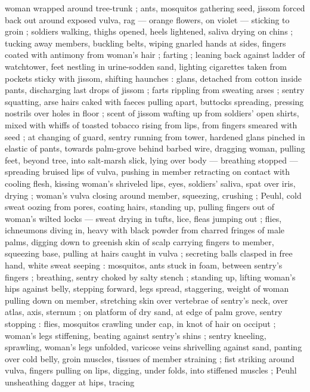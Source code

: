 woman wrapped around tree-trunk ; ants, mosquitos gathering seed, jissom forced back out around
exposed vulva, rag --- orange flowers, on violet --- sticking to groin ; soldiers walking, thighs
opened, heels lightened, saliva drying on chins ; tucking away members, buckling belts, wiping
gnarled hands at sides, fingers coated with antimony from woman's hair ; farting ; leaning back
against ladder of watchtower, feet nestling in urine-sodden sand, lighting cigarettes %
taken from pockets sticky with jissom, shifting haunches : glans, detached from cotton inside pants,
discharging last drops of jissom ; farts rippling from sweating arses ; sentry squatting, arse hairs
caked with faeces pulling apart, buttocks spreading, pressing nostrils over holes in floor ; scent
of jissom wafting up from soldiers' open shirts, mixed with whiffs of toasted tobacco rising from
lips, from fingers smeared with seed ; at changing of guard, sentry running from tower, hardened
glans pinched in elastic of pants, towards palm-grove behind barbed wire, dragging woman, pulling
feet, beyond tree, into salt-marsh slick, lying over body --- breathing stopped --- spreading
bruised lips of vulva, pushing in member retracting on contact with cooling flesh, kissing woman's
shriveled lips, eyes, soldiers' saliva, spat over iris, drying ; woman's vulva closing around
member, squeezing, crushing ; Peuhl, cold sweat oozing from pores, coating hairs, standing up,
pulling fingers out of woman's wilted locks --- sweat drying in tufts, lice, fleas jumping out ;
flies, ichneumons diving in, heavy with black powder from charred fringes of male palms, digging
down to greenish skin of scalp {\dashcom} carrying fingers to member, squeezing base, pulling at
hairs caught in vulva ; secreting balls clasped in free hand, white sweat seeping : mosquitos, ants
stuck in foam, between sentry's fingers ; breathing, sentry choked by salty stench ; standing up,
lifting woman's hips against belly, stepping forward, legs spread, staggering, weight of woman
pulling down on member, stretching skin over vertebrae of sentry's neck, over atlas, axis, sternum ;
on platform of dry sand, at edge of palm grove, sentry stopping : flies, mosquitos crawling under
cap, in knot of hair on occiput ; woman's legs stiffening, beating against sentry's shins ; sentry
kneeling, sprawling, woman's legs unfolded, varicose veins shrivelling against sand, panting over
cold belly, groin muscles, tissues of member straining ; fist striking around vulva, fingers pulling
on lips, digging, under folds, into stiffened muscles ; Peuhl unsheathing dagger at hips, tracing
